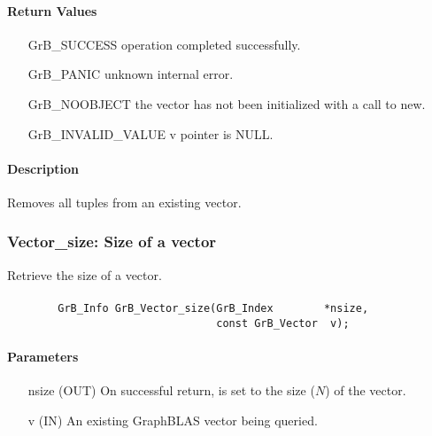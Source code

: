 \paragraph{Return Values}

\begin{itemize}[leftmargin=2.1in]
\item[{\sf GrB\_SUCCESS}]   operation completed successfully.
\item[{\sf GrB\_PANIC}]     unknown internal error.
\item[{\sf GrB\_NOOBJECT}]  the vector has not been initialized with a call to new.
\item[{\sf GrB\_INVALID\_VALUE}]    {\sf v} pointer is {\sf NULL}.
\end{itemize}

\paragraph{Description}

Removes all tuples from an existing vector.

\subsubsection{{\sf Vector\_size}: Size of a vector}

Retrieve the size of a vector.

\paragraph{\syntax}

\begin{verbatim}
        GrB_Info GrB_Vector_size(GrB_Index        *nsize,
                                 const GrB_Vector  v);
\end{verbatim}

\paragraph{Parameters}

\begin{itemize}[leftmargin=1.1in]
    \item[{\sf nsize}] ({\sf OUT}) On successful return, is set to the size ($N$) 
                                   of the vector.
    \item[{\sf v}]     ({\sf IN})  An existing GraphBLAS vector being queried.
\end{itemize}

